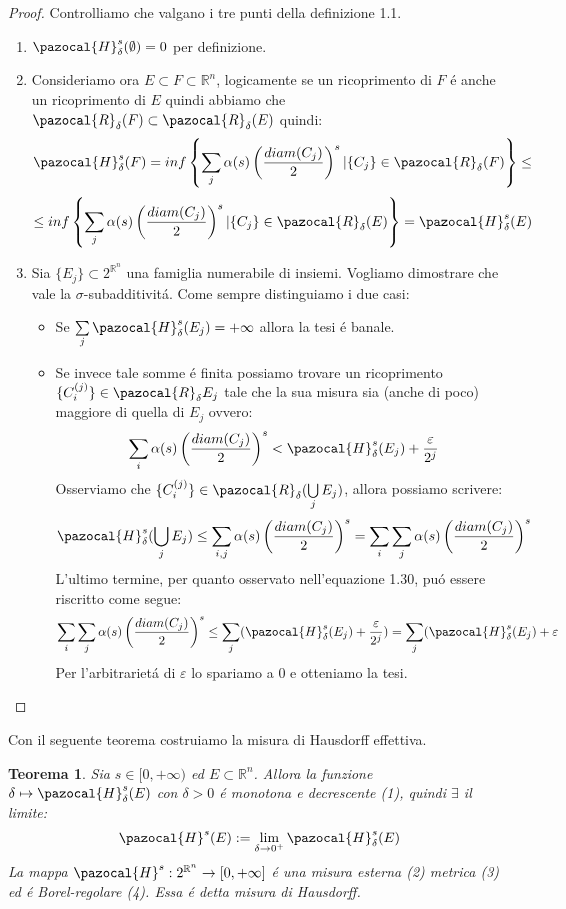 \documentclass[11pt,a4paper]{report}
\theoremstyle{plain}
\newtheorem{thm}{Teorema}[chapter] %
\theoremstyle{definition}
\newcommand{\Ha}{\pazocal{H}_\delta}
\newcommand{\Hu}{\pazocal{H}}
\begin{document}
\begin{proof}
	Controlliamo che valgano i tre punti della definizione 1.1.
	\begin{enumerate}
		\item $\Ha^s(\emptyset) = 0$ per definizione.
		\item Consideriamo ora $E \subset F \subset \mathbb{R}^n$, logicamente se un ricoprimento di $F$ \'e anche un ricoprimento di $E$ quindi abbiamo che $\pazocal{R}_\delta(F) \subset \pazocal{R}_\delta(E)$ quindi:
		\[
			\Ha^s(F) = inf\left\{\sum\limits_j \alpha(s) \left(\frac{diam(C_j)}{2}\right)^s | \{C_j\} \in  \pazocal{R}_\delta(F)\right\} \le
		\]
		\[			
			 \le inf\left\{\sum\limits_j \alpha(s) \left(\frac{diam(C_j)}{2}\right)^s | \{C_j\} \in  \pazocal{R}_\delta(E)\right\} = \Ha^s(E)
		\]
		\item Sia $\{E_j\} \subset 2^{\mathbb{R}^n}$ una famiglia numerabile di insiemi. Vogliamo dimostrare che vale la $\sigma$-subadditivit\'a.
		Come sempre distinguiamo i due casi:
			\begin{itemize}
				\item Se $\sum\limits_j \Ha^s(E_j) = +\infty$ allora la tesi \'e banale.
				\item Se invece tale somme \'e finita possiamo trovare un ricoprimento $\{C_i^{(j)}\} \in \pazocal{R}_\delta E_j$ tale che la sua misura sia (anche di poco) maggiore di quella di $E_j$ ovvero:
				\begin{equation}
					\sum\limits_i \alpha(s) \left(\frac{diam(C_j)}{2}\right)^s < \Ha^s(E_j) + \frac{\varepsilon}{2^j}	
				\end{equation}
				Osserviamo che $\{C_i^{(j)}\} \in \pazocal{R}_\delta(\bigcup\limits_j E_j)$, allora possiamo scrivere:
				\[
					\Ha^s(\bigcup\limits_j E_j)	 \le \sum\limits_{i,j} \alpha(s) \left(\frac{diam(C_j)}{2}\right)^s = \sum\limits_{i}\sum\limits_{j} \alpha(s) \left(\frac{diam(C_j)}{2}\right)^s
				\]
				L'ultimo termine, per quanto osservato nell'equazione 1.30, pu\'o essere riscritto come segue:
				\[
					\sum\limits_{i}\sum\limits_{j} \alpha(s) \left(\frac{diam(C_j)}{2}\right)^s \le \sum\limits_j(\Ha^s(E_j) + \frac{\varepsilon}{2^j}) = \sum\limits_j(\Ha^s(E_j) + \varepsilon
				\]
				Per l'arbitrariet\'a di $\varepsilon$ lo spariamo a $0$ e otteniamo la tesi.
			\end{itemize}
	\end{enumerate}
\end{proof}
Con il seguente teorema costruiamo la misura di Hausdorff effettiva.
\begin{thm}
	Sia $s \in [0, +\infty)$ ed $E \subset \mathbb{R}^n$. Allora la funzione $\delta \mapsto \Ha^s(E)$ con $\delta > 0$ \'e monotona e decrescente (1), quindi $\exists$ il limite:
	\[
		\Hu^s(E) := \lim\limits_{\delta \rightarrow 0^+} \Ha^s(E)	
	\]
	La mappa $\Hu^s : 2^{\mathbb{R}^n} \rightarrow [0, +\infty]$ \'e una misura esterna (2) metrica (3) ed \'e Borel-regolare (4). Essa \'e detta \textit{misura di Hausdorff}.
\end{thm}
\end{document}
